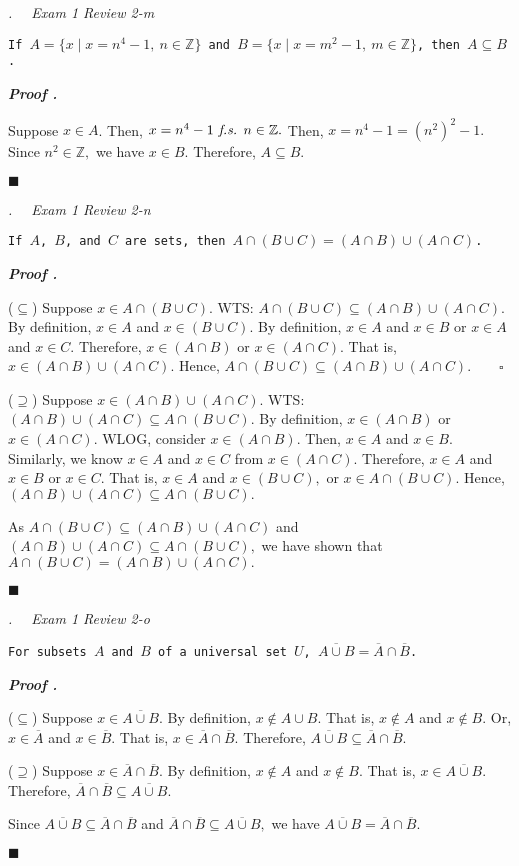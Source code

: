 \documentclass[11pt,letter]{article}
\newcounter{nq}[section]
\newcounter{np}[section]
\newenvironment*{p}{\par\noindent\textbf{\textit{Proof \stepcounter{np}\thenp. }}\par}{\par\hfill $\blacksquare$\par}
\newenvironment*{q}[1]{\noindent\emph{\thesection.\stepcounter{nq}\thenq$\quad $ #1}\par\noindent\texttt}{}
\def\Z{{\mathbb{Z}}}
\def\fs{\emph{ f.s. }}
\begin{document}
\begin{framed}\begin{q}
	{Exam 1 Review 2-m}
	{If $A=\{x\mid x=n^4-1,\ n\in\Z\}$ and $B=\{x\mid x=m^2-1,\ m\in\Z\}$, then $A\subseteq B$.}
\end{q}\end{framed}
\begin{p}
	Suppose $x\in A$. Then, $x=n^4-1\fs n\in\Z.$ Then, $x=n^4-1=(n^2)^2-1.$ Since $n^2\in\Z,$ we have $x\in B.$ Therefore, $A\subseteq B.$	
\end{p}

\begin{framed}\begin{q}
	{Exam 1 Review 2-n}
	{If $A$, $B$, and $C$ are sets, then $A\cap(B\cup C)=(A\cap B)\cup(A\cap C)$.}
\end{q}\end{framed}
\begin{p}
	($\subseteq$) Suppose $x\in A\cap(B\cup C).$ WTS: $A\cap(B\cup C)\subseteq(A\cap B)\cup(A\cap C).$ By definition, $x\in A$ and $x\in(B\cup C)$. By definition, $x\in A$ and $x\in B$ or $x\in A$ and $x\in C.$ Therefore, $x\in(A\cap B)$ or $x\in(A\cap C).$ That is, $x\in(A\cap B)\cup(A\cap C).$ Hence, $A\cap(B\cup C)\subseteq(A\cap B)\cup(A\cap C).\qquad\square$\par 
	($\supseteq$) Suppose $x\in(A\cap B)\cup(A\cap C).$ WTS: $(A\cap B)\cup(A\cap C)\subseteq A\cap(B\cup C).$ By definition, $x\in(A\cap B)$ or $x\in(A\cap C).$ WLOG, consider $x\in(A\cap B).$ Then, $x\in A$ and $x\in B.$ Similarly, we know $x\in A$ and $x\in C$ from $x\in(A\cap C).$ Therefore, $x\in A$ and $x\in B$ or $x\in C.$ That is, $x\in A$ and $x\in(B\cup C),$ or $x\in A\cap(B\cup C).$ Hence, $(A\cap B)\cup(A\cap C)\subseteq A\cap(B\cup C).$\par 
	As $A\cap(B\cup C)\subseteq(A\cap B)\cup(A\cap C)$ and $(A\cap B)\cup(A\cap C)\subseteq A\cap(B\cup C),$ we have shown that $A\cap(B\cup C)=(A\cap B)\cup(A\cap C).$
\end{p}

\begin{framed}\begin{q}
	{Exam 1 Review 2-o}
	{For subsets $A$ and $B$ of a universal set $U$, $\overline{A\cup B}=\overline{A}\cap\overline{B}$.}
\end{q}\end{framed}
\begin{p}
	($\subseteq$) Suppose $x\in\overline{A\cup B}.$ By definition, $x\notin A\cup B$. That is, $x\notin A$ and $x\notin B.$ Or, $x\in\overline{A}$ and $x\in\overline{B}.$ That is, $x\in\overline{A}\cap\overline{B}.$ Therefore, $\overline{A\cup B}\subseteq\overline{A}\cap\overline{B}.$\par 
	($\supseteq$) Suppose $x\in\overline{A}\cap\overline{B}.$ By definition, $x\notin A$ and $x\notin B$. That is, $x\in\overline{A\cup B}.$ Therefore, $\overline{A}\cap\overline{B}\subseteq\overline{A\cup B}.$\par 
	Since $\overline{A\cup B}\subseteq\overline{A}\cap\overline{B}$ and $\overline{A}\cap\overline{B}\subseteq\overline{A\cup B},$ we have $\overline{A\cup B}=\overline{A}\cap\overline{B}.$
\end{p}
\end{document}
